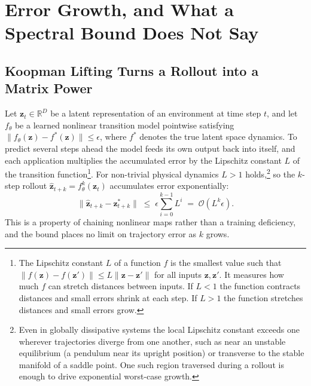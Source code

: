\documentclass[10pt]{article} %
\newcommand{\z}{\bm{z}}
\begin{document}
\section{Error Growth, and What a Spectral Bound Does Not Say}
\label{sec:background}

\subsection{Koopman Lifting Turns a Rollout into a Matrix Power}
\label{sec:koopman}
Let $\z_t \in \mathbb{R}^D$ be a latent representation of an environment at time step $t$, and let $f_\theta$ be a learned nonlinear transition model pointwise satisfying $\|f_\theta(\z) - f^*(\z)\| \le \epsilon$, where $f^*$ denotes the true latent space dynamics. To predict several steps ahead the model feeds its own output back into itself, and each application multiplies the accumulated error by the Lipschitz constant $L$ of the transition function\footnote{The Lipschitz constant $L$ of a function $f$ is the smallest value such that $\|f(\z) - f(\z')\| \le L\|\z - \z'\|$ for all inputs $\z, \z'$. It measures how much $f$ can stretch distances between inputs. If $L < 1$ the function contracts distances and small errors shrink at each step. If $L > 1$ the function stretches distances and small errors grow.}. For non-trivial physical dynamics $L > 1$ holds,\footnote{Even in globally dissipative systems the local Lipschitz constant exceeds one wherever trajectories diverge from one another, such as near an unstable equilibrium (a pendulum near its upright position) or transverse to the stable manifold of a saddle point. One such region traversed during a rollout is enough to drive exponential worst-case growth.} so the $k$-step rollout $\hat{\z}_{t+k} = f_\theta^k(\z_t)$ accumulates error exponentially:
\begin{equation}
    \|\hat{\z}_{t+k} - \z^*_{t+k}\| \;\leq\;
    \epsilon \sum_{i=0}^{k-1} L^i \;=\; \mathcal{O}(L^k \epsilon).
    \label{eq:compound}
\end{equation}
This is a property of chaining nonlinear maps rather than a training deficiency, and the bound places no limit on trajectory error as $k$ grows.
\end{document}

